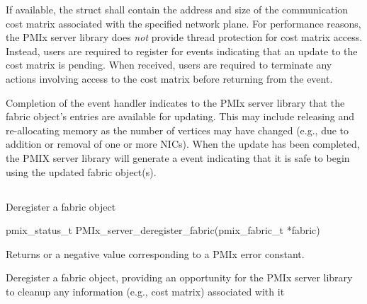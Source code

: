 If available, the  struct shall contain the address and size of the communication cost matrix associated with the specified network plane. For performance reasons, the \ac{PMIx} server library does \emph{not} provide thread protection for cost matrix access. Instead, users are required to register for  events indicating that an update to the cost matrix is pending. When received, users are required to terminate any actions involving access to the cost matrix before returning from the event.

Completion of the  event handler indicates to the \ac{PMIx} server library that the fabric object's entries are available for updating. This may include releasing and re-allocating memory as the number of vertices may have changed (e.g., due to addition or removal of one or more \acp{NIC}). When the update has been completed, the \ac{PMIX} server library will generate a  event indicating that it is safe to begin using the updated fabric object(s).

\subsection{}

\summary

Deregister a fabric object

\format

\cspecificstart
\begin{codepar}
pmix_status_t PMIx_server_deregister_fabric(pmix_fabric_t *fabric)
\end{codepar}
\cspecificend

\begin{arglist}
\end{arglist}

Returns  or a negative value corresponding to a \ac{PMIx} error constant.

\descr

Deregister a fabric object, providing an opportunity for the \ac{PMIx} server library to cleanup any information (e.g., cost matrix) associated with it


\subsection{}

